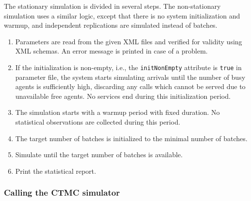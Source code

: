 The stationary simulation is divided in several steps.
The non-stationary simulation uses a similar logic, except that there
is no system initialization and warmup, and independent replications
are simulated instead of batches.

\begin{enumerate}
\item Parameters are read from the given XML files and verified for
  validity using XML schemas.  An error message is printed in case of
  a problem.
\item If the initialization is non-empty, i.e., the
  \texttt{init\-Non\-Empty} attribute is \texttt{true} in parameter
  file, the system starts simulating
  arrivals until the number of busy agents is sufficiently high,
  discarding any calls which cannot be served due to unavailable free
  agents.  No services end during this initialization period.
\item The simulation starts with a warmup period with fixed
  duration.  No statistical observations are collected during this
  period.
\item The target number of batches is initialized to the minimal
  number of batches.
\item Simulate until the target number of batches is available.
\item Print the statistical report.
\end{enumerate}

\subsubsection{Calling the CTMC simulator}

